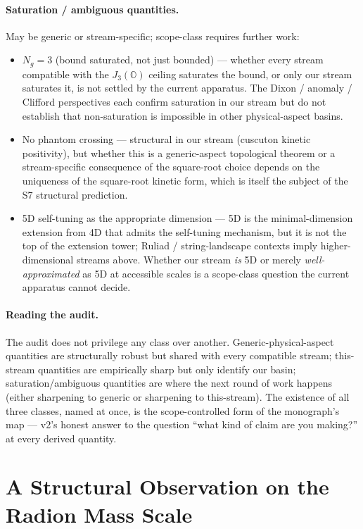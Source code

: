 \paragraph{Saturation / ambiguous quantities.}
May be generic or stream-specific; scope-class requires further work:
\begin{itemize}\setlength{\itemsep}{0pt}
  \item $N_g = 3$ (bound saturated, not just bounded) --- whether every stream compatible with the $J_3(\mathbb{O})$ ceiling saturates the bound, or only our stream saturates it, is not settled by the current apparatus. The Dixon / anomaly / Clifford perspectives each confirm saturation in our stream but do not establish that non-saturation is impossible in other physical-aspect basins.
  \item No phantom crossing --- structural in our stream (cuscuton kinetic positivity), but whether this is a generic-aspect topological theorem or a stream-specific consequence of the square-root choice depends on the uniqueness of the square-root kinetic form, which is itself the subject of the S7 structural prediction.
  \item 5D self-tuning as the appropriate dimension --- 5D is the minimal-dimension extension from 4D that admits the self-tuning mechanism, but it is not the top of the extension tower; Ruliad / string-landscape contexts imply higher-dimensional streams above. Whether our stream \emph{is} 5D or merely \emph{well-approximated} as 5D at accessible scales is a scope-class question the current apparatus cannot decide.
\end{itemize}

\paragraph{Reading the audit.}
The audit does not privilege any class over another.  Generic-physical-aspect quantities are structurally robust but shared with every compatible stream; this-stream quantities are empirically sharp but only identify our basin; saturation/ambiguous quantities are where the next round of work happens (either sharpening to generic or sharpening to this-stream).  The existence of all three classes, named at once, is the scope-controlled form of the monograph's map --- v2's honest answer to the question ``what kind of claim are you making?'' at every derived quantity.

\section{A Structural Observation on the Radion Mass Scale}
\label{app:radion-thinness}

